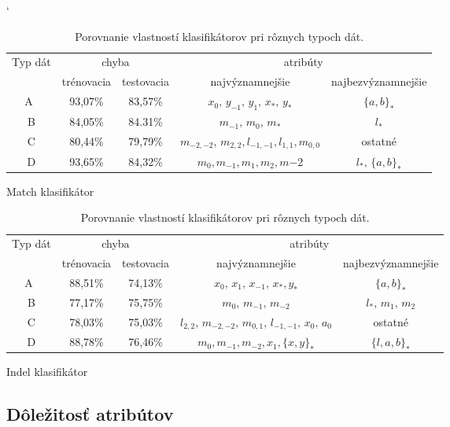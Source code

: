 \begin{table}[htp]
\catcode`
\centering
\begin{subtable}{\textwidth}
\centering
\begin{tabular}{ccccc}
\toprule
\multirow{2}{*}{Typ dát} & \multicolumn{2}{c}{chyba} & \multicolumn{2}{c}{atribúty}\\
\cmidrule(r){2-3}\cmidrule{4-5}
 & trénovacia & testovacia & najvýznamnejšie & najbezvýznamnejšie\\
\midrule
A~& 93,07\% & 83,57\% & $x_0,\, y_{-1},\, y_{1},\, x_*,\, y_*$ & $\{a,b\}_*$\\
B & 84,05\% & 84.31\% & $m_{-1},\, m_0,\, m_*$ & $l_*$ \\
C & 80,44\% & 79,79\% & $m_{-2,-2},\, m_{2,2}, l_{-1,-1}, l_{1,1}, m_{0,0}$ & ostatné\\
D & 93,65\% & 84,32\% & $m_0, m_{-1}, m_1, m_2, m{-2}$ & $l_*,\, \{a,b\}_*$\\
\bottomrule
\end{tabular}
\caption{Match klasifikátor}
\end{subtable}

\vspace{1cm}

\begin{subtable}{\textwidth}
\centering
\begin{tabular}{ccccc}
\toprule
\multirow{2}{*}{Typ dát} & \multicolumn{2}{c}{chyba} & \multicolumn{2}{c}{atribúty}\\
\cmidrule(r){2-3}\cmidrule{4-5}
 & trénovacia & testovacia & najvýznamnejšie & najbezvýznamnejšie\\
\midrule
A~& 88,51\% & 74,13\% & $x_0,\, x_{1},\, x_{-1},\, x_*, y_*$ & $\{a,b\}_*$\\
B & 77,17\% & 75,75\% & $m_0,\, m_{-1},\, m_{-2}$ & $l_*,\, m_1,\, m_2$ \\
C & 78,03\% & 75,03\% & $l_{2,2},\,m_{-2,-2},\,m_{0,1},\,l_{-1,-1},\, x_0,\,a_0$ & ostatné\\
D & 88,78\% & 76,46\% & $m_0, m_{-1}, m_{-2}, x_1, \{x, y\}_*$ & $\{l,a,b\}_*$\\
\bottomrule
\end{tabular}
\caption{Indel klasifikátor}
\end{subtable}
\caption[Porovnanie vlastností klasifikátorov]{Porovnanie vlastností klasifikátorov pri rôznych typoch dát.}
\label{tab:clf-results}
\end{table}

\subsection{Dôležitosť atribútov}

